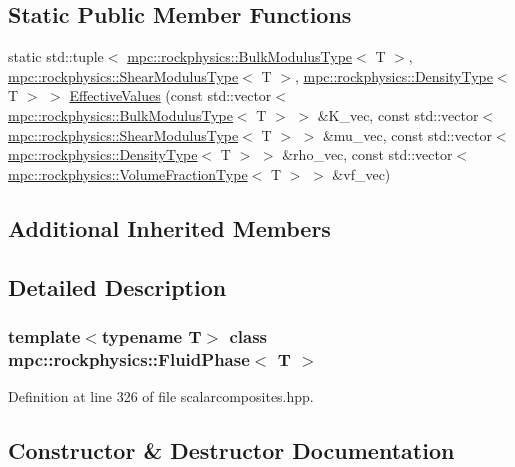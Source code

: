 \subsection*{Static Public Member Functions}
\begin{DoxyCompactItemize}
\item 
static std\+::tuple$<$ \mbox{\hyperlink{structmpc_1_1rockphysics_1_1_bulk_modulus_type}{mpc\+::rockphysics\+::\+Bulk\+Modulus\+Type}}$<$ T $>$, \mbox{\hyperlink{structmpc_1_1rockphysics_1_1_shear_modulus_type}{mpc\+::rockphysics\+::\+Shear\+Modulus\+Type}}$<$ T $>$, \mbox{\hyperlink{structmpc_1_1rockphysics_1_1_density_type}{mpc\+::rockphysics\+::\+Density\+Type}}$<$ T $>$ $>$ \mbox{\hyperlink{classmpc_1_1rockphysics_1_1_fluid_phase_a7f6accc4d8dfd7b8e6f55f3338698121}{Effective\+Values}} (const std\+::vector$<$ \mbox{\hyperlink{structmpc_1_1rockphysics_1_1_bulk_modulus_type}{mpc\+::rockphysics\+::\+Bulk\+Modulus\+Type}}$<$ T $>$ $>$ \&K\+\_\+vec, const std\+::vector$<$ \mbox{\hyperlink{structmpc_1_1rockphysics_1_1_shear_modulus_type}{mpc\+::rockphysics\+::\+Shear\+Modulus\+Type}}$<$ T $>$ $>$ \&mu\+\_\+vec, const std\+::vector$<$ \mbox{\hyperlink{structmpc_1_1rockphysics_1_1_density_type}{mpc\+::rockphysics\+::\+Density\+Type}}$<$ T $>$ $>$ \&rho\+\_\+vec, const std\+::vector$<$ \mbox{\hyperlink{structmpc_1_1rockphysics_1_1_volume_fraction_type}{mpc\+::rockphysics\+::\+Volume\+Fraction\+Type}}$<$ T $>$ $>$ \&vf\+\_\+vec)
\end{DoxyCompactItemize}
\subsection*{Additional Inherited Members}


\subsection{Detailed Description}
\subsubsection*{template$<$typename T$>$\newline
class mpc\+::rockphysics\+::\+Fluid\+Phase$<$ T $>$}



Definition at line 326 of file scalarcomposites.\+hpp.



\subsection{Constructor \& Destructor Documentation}
\mbox{\label{classmpc_1_1rockphysics_1_1_fluid_phase_a2705193cd79d12fd6bc9a39f0eee6898}} 
